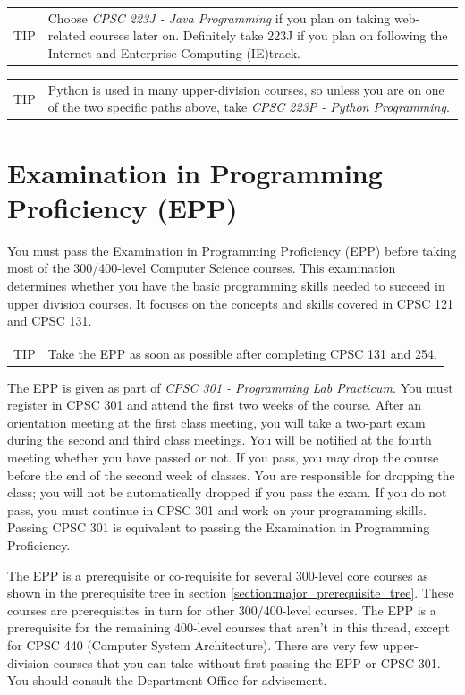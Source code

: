 \documentclass{book}
\newenvironment{tip}{
  \tcolorbox \begin{tabular}{m{.5in} m{5in}} \Large{TIP} &
}{
  \end{tabular} \endtcolorbox
}
\newcommand{\ietrackname}{Internet and Enterprise Computing (IE)}
\begin{document}
\begin{tip}
Choose \emph{CPSC 223J - Java Programming} if you plan on taking web-related courses later on. Definitely take 223J if you plan on following the \ietrackname track\ietrackindex.
\end{tip}

\begin{tip}
  Python is used in many upper-division courses, so unless you are on one of the two specific paths above, take \emph{CPSC 223P - Python Programming}.
  \end{tip}

\section{Examination in Programming Proficiency (EPP)}
You must pass the Examination in Programming Proficiency (EPP) before taking most of the 300/400-level Computer Science courses. This examination determines whether you have the basic programming skills needed to succeed in upper division courses. It focuses on the concepts and skills covered in CPSC 121 and CPSC 131.

\begin{tip}
  Take the EPP as soon as possible after completing CPSC 131 and 254.
  \end{tip}

The EPP is given as part of \emph{CPSC 301 - Programming Lab Practicum.} You must register in CPSC 301 and attend the first two weeks of the course. After an orientation meeting at the first class meeting, you will take a two-part exam during the second and third class meetings. You will be notified at the fourth meeting whether you have passed or not. If you pass, you may drop the course before the end of the second week of classes. You are responsible for dropping the class; you will not be automatically dropped if you pass the exam. If you do not pass, you must continue in CPSC 301 and work on your programming skills. Passing CPSC 301 is equivalent to passing the Examination in Programming Proficiency.

The EPP is a prerequisite or co-requisite for several 300-level core courses as shown in the prerequisite tree in section \ref{section:major_prerequisite_tree}. These courses are prerequisites in turn for other 300/400-level courses. The EPP is a prerequisite for the remaining 400-level courses that aren’t in this thread, except for CPSC 440 (Computer System Architecture). There are very few upper-division courses that you can take without first passing the EPP or CPSC 301. You should consult the Department Office for advisement.
\end{document}
